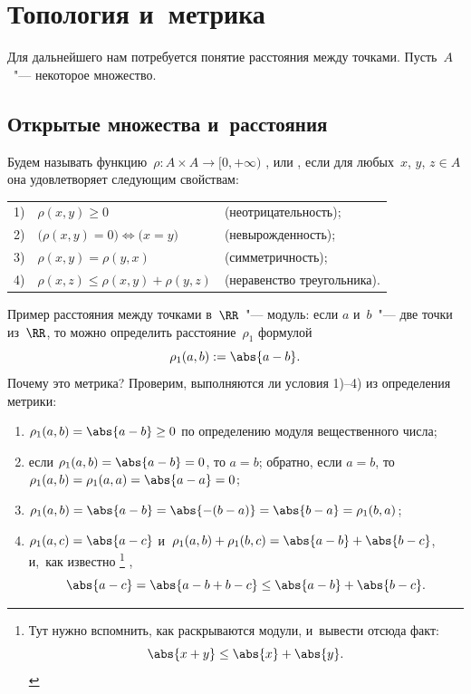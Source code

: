 
\section{Топология и~метрика}

Для дальнейшего нам потребуется понятие расстояния между точками. Пусть~$A$~"--- некоторое множество.

\subsection{Открытые множества и~расстояния}

\begin{definition}
	Будем называть функцию~$\rho \colon A \times A \to [0, +\infty)$
	, или , если для любых~$x$, $y$, $z \in A$
	она удовлетворяет следующим свойствам:%
	\par
	\addvspace{\medskipamount}%
	\begin{tabular}{rl@{\qquad}l}
		1) & $\rho(x, y) \geq 0$ & (неотрицательность);
		\\[\smallskipamount]
		2) & $\bigl( \rho(x, y) = 0 \bigr) \iff \bigl( x = y \bigr)$ &
			 (невырожденность);
		\\[\smallskipamount]
		3) & $\rho(x, y) = \rho(y, x)$ & (симметричность);
		\\[\smallskipamount]
		4) & $\rho(x, z) \leq \rho(x, y) + \rho(y, z)$ & (неравенство треугольника).
	\end{tabular}
\end{definition}

\begin{example}
	Пример расстояния между точками в~$\RR$~"--- модуль: если $a$ и~$b$~"--- две
	точки из~$\RR$, то можно определить расстояние~$\rho_1$ формулой
	\[
		\rho_1(a, b) := \abs{a - b}.
	\]
	Почему это метрика? Проверим, выполняются ли условия 1)--4) из определения
	метрики:
	\begin{enumerate}[1)]
		\item $\rho_1(a, b) = \abs{a - b} \geq 0$ по определению модуля
			вещественного числа;
		\item если $\rho_1(a, b) = \abs{a - b} = 0$, то $a = b$; обратно, если $a =
			b$, то $\rho_1(a, b) = \rho_1(a, a) = \abs{a - a} = 0$;
		\item $\rho_1(a, b) = \abs{a - b} = \abs{-(b - a)} = \abs{b - a} =
			\rho_1(b, a)$;
		\item $\rho_1(a, c) = \abs{a - c}$ и~$\rho_1(a, b) + \rho_1(b, c) = \abs{a
			- b} + \abs{b - c}$, и,~как известно%
			\footnote{%
				Тут нужно вспомнить, как раскрываются модули, и~вывести отсюда факт:
				\[
					\abs{x + y} \leq \abs{x} + \abs{y}
					.
				\]
			}%
			,
			\[
				\abs{a - c} =
				\abs{a - b + b - c} \leq
				\abs{a - b} + \abs{b - c}
				.
			\]
	\end{enumerate}
\end{example}

